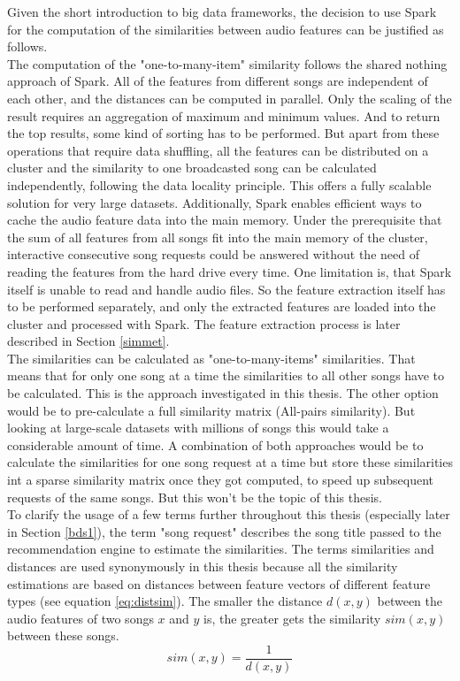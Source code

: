 Given the short introduction to big data frameworks, the decision to use Spark for the computation of the similarities between audio features can be justified as follows.\\
The computation of the "one-to-many-item" similarity follows the shared nothing approach of Spark. All of the features from different songs are independent of each other, and the distances can be computed in parallel. Only the scaling of the result requires an aggregation of maximum and minimum values. And to return the top results, some kind of sorting has to be performed. But apart from these operations that require data shuffling, all the features can be distributed on a cluster and the similarity to one broadcasted song can be calculated independently, following the data locality principle. This offers a fully scalable solution for very large datasets. Additionally, Spark enables efficient ways to cache the audio feature data into the main memory. Under the prerequisite that the sum of all features from all songs fit into the main memory of the cluster, interactive consecutive song requests could be answered without the need of reading the features from the hard drive every time.
One limitation is, that Spark itself is unable to read and handle audio files. So the feature extraction itself has to be performed separately, and only the extracted features are loaded into the cluster and processed with Spark. The feature extraction process is later described in Section \ref{simmet}.\\
The similarities can be calculated as "one-to-many-items" similarities. That means that for only one song at a time the similarities to all other songs have to be calculated. This is the approach investigated in this thesis. The other option would be to pre-calculate a full similarity matrix (All-pairs similarity). But looking at large-scale datasets with millions of songs this would take a considerable amount of time. A combination of both approaches would be to calculate the similarities for one song request at a time but store these similarities int a sparse similarity matrix once they got computed, to speed up subsequent requests of the same songs. But this won't be the topic of this thesis.\\ 
To clarify the usage of a few terms further throughout this thesis (especially later in Section \ref{bds1}), the term "song request" describes the song title passed to the recommendation engine to estimate the similarities. The terms similarities and distances are used synonymously in this thesis because all the similarity estimations are based on distances between feature vectors of different feature types (see equation \ref{eq:distsim}). The smaller the distance $d(x, y)$ between the audio features of two songs $x$ and $y$ is, the greater gets the similarity $sim(x, y)$ between these songs.\\
\begin{equation} \label{eq:distsim}
sim(x, y) = \frac{1}{d(x, y)}
\end{equation}

